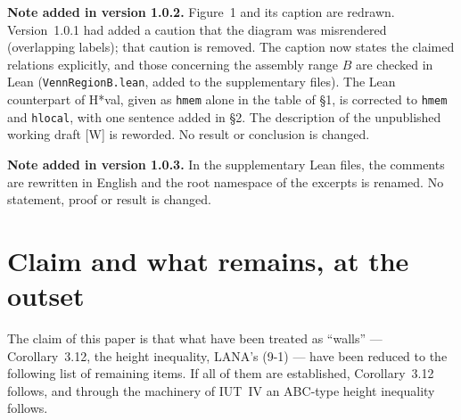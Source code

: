 \documentclass[11pt]{article}
\begin{document}
\begin{abstract}
The difference from the author's preceding work [U26], \emph{Where
Theorem 3.11 sits}, is stated at the outset.  What [U26] proved is
negative: from the statements actually cited in the proof of
Corollary~3.12 alone, Corollary~3.12 does not follow (a countermodel
exists).  The present paper works in the opposite direction: using
the content of the actual construction outside the cited range, it
assembles the passage at the statement level (the level at which
numbered statements are used as black boxes and the seams between
them are filled by expanding definitions).  In the author's view,
many of the seams written out here may correspond to parts that were
present in the IUT author's mind but were not written down, inside
the proof of Corollary~3.12, as citable statements; the work of this
paper may be read as an attempt to supply that unwritten layer.
This is the author's interpretation, not a claim about the IUT
author's intentions.

\smallskip
\noindent\emph{Keywords:} inter-universal Teichm\"uller theory,
Corollary~3.12, scale preservation, multiradial representation,
completeness, formalization (Lean), cyclotomic rigidity.
\end{abstract}

\medskip
\noindent\textbf{Note added in version 1.0.2.}
Figure~1 and its caption are redrawn.  Version~1.0.1 had added a
caution that the diagram was misrendered (overlapping labels); that
caution is removed.  The caption now states the claimed relations
explicitly, and those concerning the assembly range $B$ are checked
in Lean (\texttt{VennRegionB.lean}, added to the supplementary
files).  The Lean counterpart of H*val, given as \texttt{hmem} alone
in the table of \S1, is corrected to \texttt{hmem} and
\texttt{hlocal}, with one sentence added in \S2.  The description
of the unpublished working draft [W] is reworded.  No result or
conclusion is changed.

\medskip
\noindent\textbf{Note added in version 1.0.3.}
In the supplementary Lean files, the comments are rewritten in English
and the root namespace of the excerpts is renamed.  No statement,
proof or result is changed.

\section*{Claim and what remains, at the outset}

The claim of this paper is that what have been treated as ``walls''
--- Corollary~3.12, the height inequality, LANA's (9-1) --- have
been reduced to the following list of remaining items.  If all of
them are established, Corollary~3.12 follows, and through the
machinery of IUT~IV an ABC-type height inequality follows.
\end{document}
